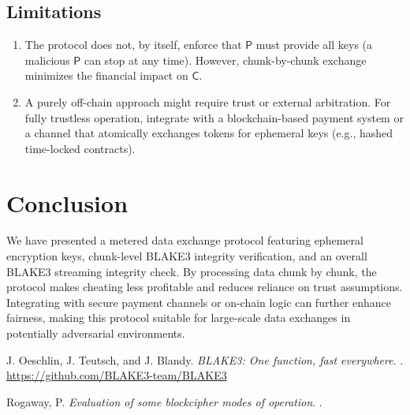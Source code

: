 \documentclass[11pt]{article}
\begin{document}
\subsection{Limitations}
\begin{enumerate}
    \item The protocol does not, by itself, enforce that $\mathsf{P}$ must provide all keys (a malicious $\mathsf{P}$ can stop at any time). 
    However, chunk-by-chunk exchange minimizes the financial impact on $\mathsf{C}$.
    \item A purely off-chain approach might require trust or external arbitration. 
    For fully trustless operation, integrate with a blockchain-based payment system or a channel that atomically exchanges tokens for ephemeral keys (e.g., hashed time-locked contracts).
\end{enumerate}

\section{Conclusion}
We have presented a metered data exchange protocol featuring ephemeral encryption keys, chunk-level BLAKE3 integrity verification, and an overall BLAKE3 streaming integrity check. 
By processing data chunk by chunk, the protocol makes cheating less profitable and reduces reliance on trust assumptions. 
Integrating with secure payment channels or on-chain logic can further enhance fairness, making this protocol suitable for large-scale data exchanges in potentially adversarial environments.


\begin{thebibliography}{9}

J. Oeschlin, J. Teutsch, and J. Blandy.
\newblock \emph{BLAKE3: One function, fast everywhere}.
. \url{https://github.com/BLAKE3-team/BLAKE3}

Rogaway, P.
\newblock \emph{Evaluation of some blockcipher modes of operation}.
.

\end{thebibliography}
\end{document}
